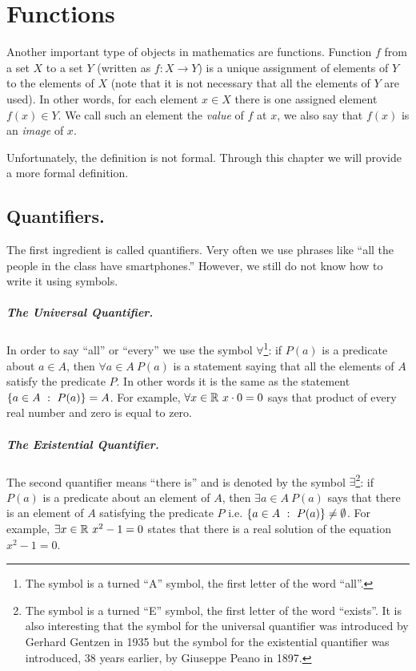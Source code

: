 \chapter{Functions}
\label{chapter:functions}

Another important type of objects in mathematics are functions. Function $f$
from a set $X$ to a set $Y$ (written as $f : X \to Y$) is a unique
assignment of elements of $Y$ to the elements of $X$ (note that it is not
necessary that all the elements of $Y$ are used). In other words, for each
element $x \in X$ there is one assigned element $f(x) \in Y$. We call such an
element the \emph{value} of $f$ at $x$, we also say that $f(x)$ is an
\emph{image} of $x$.

Unfortunately, the definition is not formal. Through this chapter we will
provide a more formal definition.

\section{Quantifiers.}
The first ingredient is called quantifiers. Very often we use phrases like ``all
the people in the class have smartphones.'' However, we still do not know how to
write it using symbols.

\paragraph{The Universal Quantifier.}
In order to say ``all'' or ``every'' we use the symbol $\forall$\footnote{%
  The symbol is a turned ``A'' symbol, the first letter of the word ``all''.
}: if $P(a)$ is a predicate about $a \in A$, then $\forall a \in A\ P(a)$ is a
statement saying that all the elements of $A$ satisfy the predicate $P$. In
other words it is the same as the statement
$\set[P(a)]{a \in A} = A$. For example, $\forall x \in \mathbb{R}\ x \cdot 0 = 0$ says
that product of every real number and zero is equal to zero.

\paragraph{The Existential Quantifier.}
The second quantifier means ``there is'' and is denoted by the symbol
$\exists$\footnote{%
  The symbol is a turned ``E'' symbol, the first letter of the word ``exists''.
  It is also interesting that the symbol for the universal quantifier was
  introduced by Gerhard Gentzen in 1935 but the symbol for the existential
  quantifier was introduced, 38 years earlier, by Giuseppe Peano in 1897.
}:
if $P(a)$ is a predicate about an element of $A$, then $\exists a \in A\ P(a)$
says that there is an element of $A$ satisfying the predicate $P$ i.e.
$\set[P(a)]{a \in A} \neq \emptyset$. For example,
$\exists x \in \mathbb{R}\ x^2 - 1 = 0$ states that there is a real solution of the
equation $x^2 - 1 = 0$.

